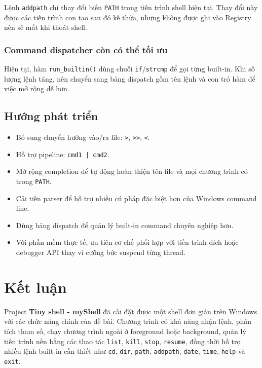 \documentclass[13pt,a4paper,oneside]{extreport}
\begin{document}
Lệnh \texttt{addpath} chỉ thay đổi biến \texttt{PATH} trong tiến trình shell hiện tại. Thay đổi này được các tiến trình con tạo sau đó kế thừa, nhưng không được ghi vào Registry nên sẽ mất khi thoát shell.

\subsection{Command dispatcher còn có thể tối ưu}

Hiện tại, hàm \texttt{run\_builtin()} dùng chuỗi \texttt{if}/\texttt{strcmp} để gọi từng built-in. Khi số lượng lệnh tăng, nên chuyển sang bảng dispatch gồm tên lệnh và con trỏ hàm để việc mở rộng dễ hơn.

\section{Hướng phát triển}

\begin{itemize}[leftmargin=1.2cm]
	\item Bổ sung chuyển hướng vào/ra file: \texttt{>}, \texttt{>>}, \texttt{<}.
	\item Hỗ trợ pipeline: \texttt{cmd1 | cmd2}.
	\item Mở rộng completion để tự động hoàn thiện tên file và mọi chương trình có trong \texttt{PATH}.
	\item Cải tiến parser để hỗ trợ nhiều cú pháp đặc biệt hơn của Windows command line.
	\item Dùng bảng dispatch để quản lý built-in command chuyên nghiệp hơn.
	\item Với phần mềm thực tế, ưu tiên cơ chế phối hợp với tiến trình đích hoặc debugger API thay vì cưỡng bức suspend từng thread.
\end{itemize}

\chapter{Kết luận}

Project \textbf{Tiny shell - myShell} đã cài đặt được một shell đơn giản trên Windows với các chức năng chính của đề bài. Chương trình có khả năng nhận lệnh, phân tích tham số, chạy chương trình ngoài ở foreground hoặc background, quản lý tiến trình nền bằng các thao tác \texttt{list}, \texttt{kill}, \texttt{stop}, \texttt{resume}, đồng thời hỗ trợ nhiều lệnh built-in cần thiết như \texttt{cd}, \texttt{dir}, \texttt{path}, \texttt{addpath}, \texttt{date}, \texttt{time}, \texttt{help} và \texttt{exit}.
\end{document}
